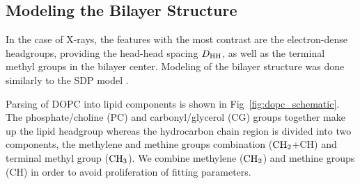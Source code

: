 \newpage
\subsection{Modeling the Bilayer Structure}
In the case of X-rays, the features with the most contrast are the 
electron-dense headgroups, providing the head-head spacing $D_\textrm{HH}$,
as well as the terminal methyl groups in the bilayer center.
Modeling of the bilayer structure was done similarly to the SDP model 
\cite{ref:Kucerka08}. 

Parsing of DOPC into lipid components is shown in
Fig~\ref{fig:dopc_schematic}. The phosphate/choline (PC) and 
carbonyl/glycerol (CG) groups together make up the lipid headgroup
whereas the hydrocarbon chain region
is divided into two components, the methylene and methine groups 
combination ($\textrm{CH}_2$+CH) and terminal methyl group ($\textrm{CH}_3$). 
We combine methylene ($\textrm{CH}_2$) and methine groups (CH) in order to avoid 
proliferation of 
fitting parameters.
